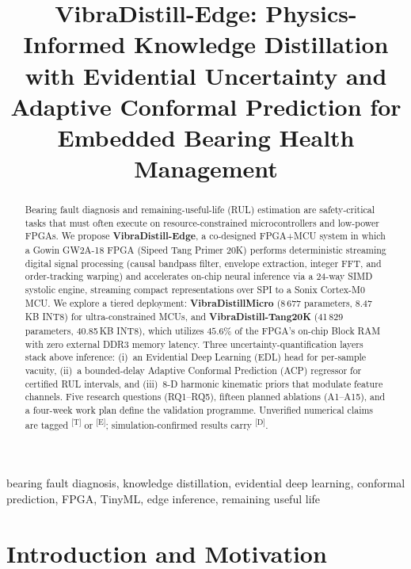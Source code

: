 \documentclass[conference]{IEEEtran}
\newcommand{\evD}{\textsuperscript{\textcolor{derived}{[D]}}\xspace}
\newcommand{\evE}{\textsuperscript{\textcolor{estimated}{[E]}}\xspace}
\newcommand{\evT}{\textsuperscript{\textcolor{target}{[T]}}\xspace}
\newcommand{\VD}{\textsf{\textbf{VibraDistill}}\xspace}
\newcommand{\VDM}{\textsf{\textbf{VibraDistillMicro}}\xspace}
\begin{document}
\title{\VD-Edge: Physics-Informed Knowledge Distillation
  with Evidential Uncertainty and Adaptive Conformal Prediction
  for Embedded Bearing Health Management}

\author{}

\maketitle

\begin{abstract}
Bearing fault diagnosis and remaining-useful-life (RUL) estimation
are safety-critical tasks that must often execute on resource-constrained
microcontrollers and low-power FPGAs.
We propose \textbf{\VD-Edge}, a co-designed FPGA+MCU system in which a
Gowin GW2A-18 FPGA (Sipeed Tang Primer 20K) performs deterministic streaming digital signal processing
(causal bandpass filter, envelope extraction, integer FFT, and order-tracking warping)
and accelerates on-chip neural inference via a 24-way SIMD systolic engine,
streaming compact representations over SPI to a Sonix Cortex-M0 MCU.
We explore a tiered deployment: \VDM{} (8\,677 parameters, 8.47\,KB INT8) for ultra-constrained MCUs,
and \textsf{\textbf{VibraDistill-Tang20K}} (41\,829 parameters, 40.85\,KB INT8), which utilizes $45.6\%$ of the
FPGA's on-chip Block RAM with zero external DDR3 memory latency.
Three uncertainty-quantification layers stack above inference:
(i)~an Evidential Deep Learning (EDL) head for per-sample vacuity,
(ii)~a bounded-delay Adaptive Conformal Prediction (ACP) regressor
for certified RUL intervals, and
(iii)~8-D harmonic kinematic priors that modulate feature channels.
Five research questions (RQ1--RQ5), fifteen planned ablations
(A1--A15), and a four-week work plan define the validation programme.
Unverified numerical claims are tagged \evT or \evE;
simulation-confirmed results carry \evD.
\end{abstract}

\begin{IEEEkeywords}
bearing fault diagnosis, knowledge distillation, evidential deep
learning, conformal prediction, FPGA, TinyML, edge inference,
remaining useful life
\end{IEEEkeywords}

\section{Introduction and Motivation}
\label{sec:intro}
\end{document}
